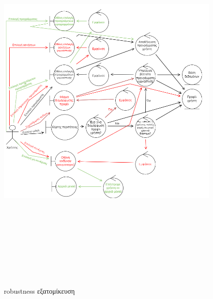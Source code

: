\begin{figure}[!htb]
  \centering
    \centering
    \includegraphics[width=19cm,height=20cm]{robust_eksatom.png}
    \caption{robustness εξατομίκευση}
    \label{}
\end{figure}

